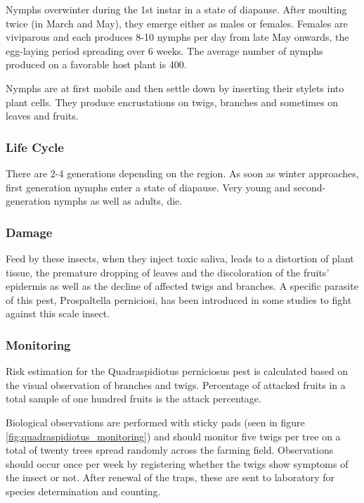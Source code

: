Nymphs overwinter during the 1st instar in a state of diapause. After moulting twice (in March and May), they emerge either as males or females. Females are viviparous and each produces 8-10 nymphs per day from late May onwards, the egg-laying period spreading over 6 weeks. The average number of nymphs produced on a favorable host plant is 400.

Nymphs are at first mobile and then settle down by inserting their stylets into plant cells. They produce encrustations on twigs, branches and sometimes on leaves and fruits.

\subsubsection{Life Cycle}

There are 2-4 generations depending on the region. As soon as winter approaches, first generation nymphs enter a state of diapause. Very young and second-generation nymphs as well as adults, die.

\subsubsection{Damage}

Feed by these insects, when they inject toxic saliva, leads to a distortion of plant tissue, the premature dropping of leaves and the discoloration of the fruits' epidermis as well as the decline of affected twigs and branches.
A specific parasite of this pest, Prospaltella perniciosi, has been introduced in some studies to fight against this scale insect.

\subsubsection{Monitoring}

Risk estimation for the Quadraspidiotus perniciosus pest is calculated based on the visual observation of branches and twigs. Percentage of attacked fruits in a total sample of one hundred fruits is the attack percentage. 

Biological observations are performed with sticky pads (seen in figure \ref{fig:quadraspidiotus_monitoring}) and should monitor five twigs per tree on a total of twenty trees spread randomly across the farming field. Observations should occur once per week by registering whether the twigs show symptoms of the insect or not. After renewal of the traps, these are sent to laboratory for species determination and counting.


